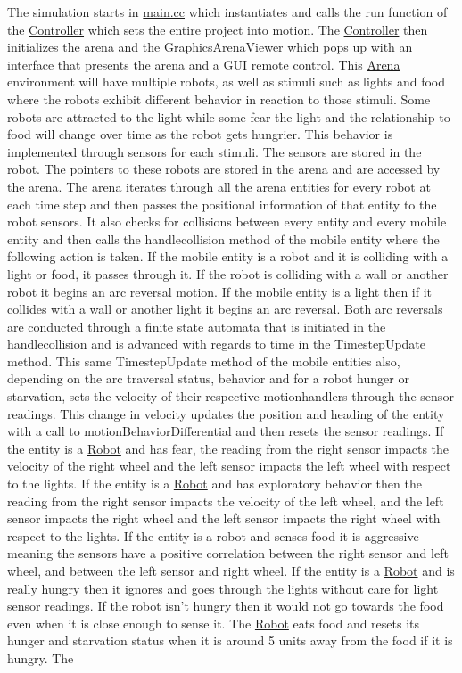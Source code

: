 The simulation starts in \mbox{\hyperlink{main_8cc}{main.\+cc}} which instantiates and calls the run function of the \mbox{\hyperlink{class_controller}{Controller}} which sets the entire project into motion. The \mbox{\hyperlink{class_controller}{Controller}} then initializes the arena and the \mbox{\hyperlink{class_graphics_arena_viewer}{Graphics\+Arena\+Viewer}} which pops up with an interface that presents the arena and a G\+UI remote control. This \mbox{\hyperlink{class_arena}{Arena}} environment will have multiple robots, as well as stimuli such as lights and food where the robots exhibit different behavior in reaction to those stimuli. Some robots are attracted to the light while some fear the light and the relationship to food will change over time as the robot gets hungrier. This behavior is implemented through sensors for each stimuli. The sensors are stored in the robot. The pointers to these robots are stored in the arena and are accessed by the arena. The arena iterates through all the arena entities for every robot at each time step and then passes the positional information of that entity to the robot sensors. It also checks for collisions between every entity and every mobile entity and then calls the handlecollision method of the mobile entity where the following action is taken. If the mobile entity is a robot and it is colliding with a light or food, it passes through it. If the robot is colliding with a wall or another robot it begins an arc reversal motion. If the mobile entity is a light then if it collides with a wall or another light it begins an arc reversal. Both arc reversals are conducted through a finite state automata that is initiated in the handlecollision and is advanced with regards to time in the Timestep\+Update method. This same Timestep\+Update method of the mobile entities also, depending on the arc traversal status, behavior and for a robot hunger or starvation, sets the velocity of their respective motionhandlers through the sensor readings. This change in velocity updates the position and heading of the entity with a call to motion\+Behavior\+Differential and then resets the sensor readings. If the entity is a \mbox{\hyperlink{class_robot}{Robot}} and has fear, the reading from the right sensor impacts the velocity of the right wheel and the left sensor impacts the left wheel with respect to the lights. If the entity is a \mbox{\hyperlink{class_robot}{Robot}} and has exploratory behavior then the reading from the right sensor impacts the velocity of the left wheel, and the left sensor impacts the right wheel and the left sensor impacts the right wheel with respect to the lights. If the entity is a robot and senses food it is aggressive meaning the sensors have a positive correlation between the right sensor and left wheel, and between the left sensor and right wheel. If the entity is a \mbox{\hyperlink{class_robot}{Robot}} and is really hungry then it ignores and goes through the lights without care for light sensor readings. If the robot isn’t hungry then it would not go towards the food even when it is close enough to sense it. The \mbox{\hyperlink{class_robot}{Robot}} eats food and resets its hunger and starvation status when it is around 5 units away from the food if it is hungry. The 
